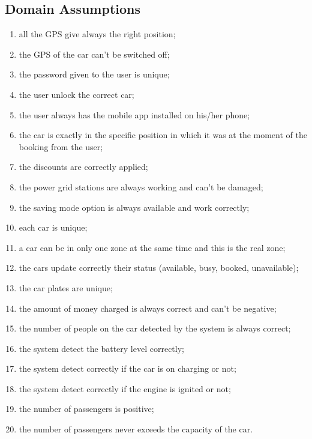 \subsection{Domain Assumptions}
\begin{enumerate}
	\item all the GPS give always the right position;
	\item the GPS of the car can't be switched off;
	\item the password given to the user is unique;
	\item the user unlock the correct car;
	\item the user always has the mobile app installed on his/her phone;
	\item the car is exactly in the specific position in which it was at the moment of the booking from the user;
	\item the discounts are correctly applied;
	\item the power grid stations are always working and can't be damaged;
	\item the saving mode option is always available and work correctly;
	\item each car is unique;
	\item a car can be in only one zone at the same time and this is the real zone;
	\item the cars update correctly their status (available, busy, booked, unavailable);
	\item the car plates are unique;
    \item the amount of money charged is always correct and can't be negative;
    \item the number of people on the car detected by the system is always correct;
    \item the system detect the battery level correctly;
    \item the system detect correctly if the car is on charging or not;
    \item the system detect correctly if the engine is ignited or not;
    \item the number of passengers is positive;
    \item the number of passengers never exceeds the capacity of the car.
\end{enumerate}
